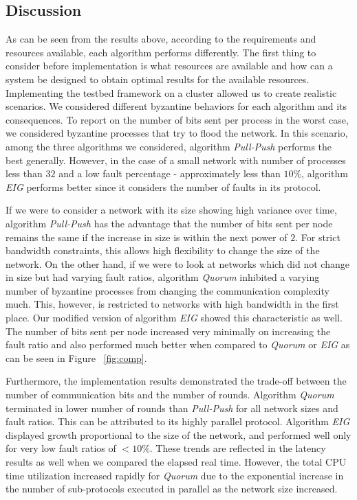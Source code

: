 ﻿
\subsection{Discussion}

As can be seen from the results above, according to the requirements and resources available, each algorithm performs differently. The first thing to consider before implementation is what resources are available and how can a system be designed to obtain optimal results for the available resources. Implementing the testbed framework on a cluster allowed us to create realistic scenarios. We considered different byzantine behaviors for each algorithm and its consequences. To report on the number of bits sent per process in the worst case, we considered byzantine processes that try to flood the network. In this scenario, among the three algorithms we considered, algorithm \textit{Pull-Push} performs the best generally. However, in the case of a small network with number of processes less than $32$ and a low fault percentage - approximately less than $10\%$, algorithm \textit{EIG} performs better since it considers the number of faults in its protocol. 

If we were to consider a network with its size showing high variance over time, algorithm \textit{Pull-Push} has the advantage that the number of bits sent per node remains the same if the increase in size is within the next power of $2$. For strict bandwidth constraints, this allows high flexibility to change the size of the network. On the other hand, if we were to look at networks which did not change in size but had varying fault ratios, algorithm \textit{Quorum} inhibited a varying number of byzantine processes from changing the communication complexity much. This, however, is restricted to networks with high bandwidth in the first place. Our modified version of algorithm \textit{EIG} showed this characteristic as well. The number of bits sent per node increased very minimally on increasing the fault ratio and also performed much better when compared to \textit{Quorum} or \textit{EIG} as can be seen in Figure ~\ref{fig:comp}.

Furthermore, the implementation results demonstrated the trade-off between the number of communication bits and the number of rounds. Algorithm \textit{Quorum} terminated in lower number of rounds than \textit{Pull-Push} for all network sizes and fault ratios. This can be attributed to its highly parallel protocol. Algorithm \textit{EIG} displayed growth proportional to the size of the network, and performed well only for very low fault ratios of $<10\%$. These trends are reflected in the latency results as well when we compared the elapsed real time. However, the total CPU time utilization increased rapidly for \textit{Quorum} due to the exponential increase in the number of sub-protocols executed in parallel as the network size increased.

